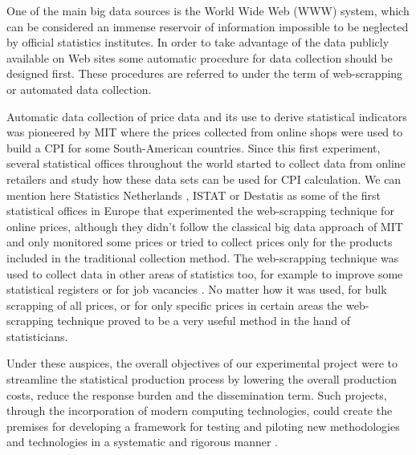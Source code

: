 \documentclass[]{article}
\begin{document}
One of the main big data sources is the World Wide Web (WWW) system, which can be considered an immense reservoir of information impossible to be neglected
by official statistics institutes. In order to take advantage of the data publicly available on Web sites some automatic procedure for data collection 
should be designed first. These procedures are referred to under the term of web-scrapping or automated data collection.

Automatic data collection of price data and its use to derive statistical indicators was pioneered by MIT \cite{MIT} where the prices collected 
from online shops were used to build a CPI for some South-American countries. Since this first experiment, several
statistical offices throughout the world started to collect data from online retailers and study how these data sets can be used
for CPI calculation. We can mention here Statistics Netherlands \cite{cbs}, ISTAT \cite{polidoro}  
or Destatis \cite{bruner} as some of the first statistical offices in Europe that experimented the web-scrapping technique for online prices, 
although they didn't follow the classical big data approach of MIT and only monitored some prices or tried to collect prices
only for the products included in the traditional collection method. The web-scrapping technique was used to collect data in other areas
of statistics too, for example to improve some statistical registers \cite{barcoli} or for job vacancies \cite{swier2}.
No matter how it was used, for bulk scrapping of all prices, or for only specific prices in certain areas \cite{cbs2} the web-scrapping technique 
proved to be a very useful method in the hand of statisticians.


Under these auspices, the overall objectives of our experimental project were to streamline the statistical production process by 
lowering the overall production costs, reduce the response burden and the dissemination term. Such projects, through the incorporation 
of modern computing technologies, could create the premises for developing a framework for testing and piloting new methodologies 
and technologies in a systematic and rigorous manner \cite{ons2017}. 
\end{document}
